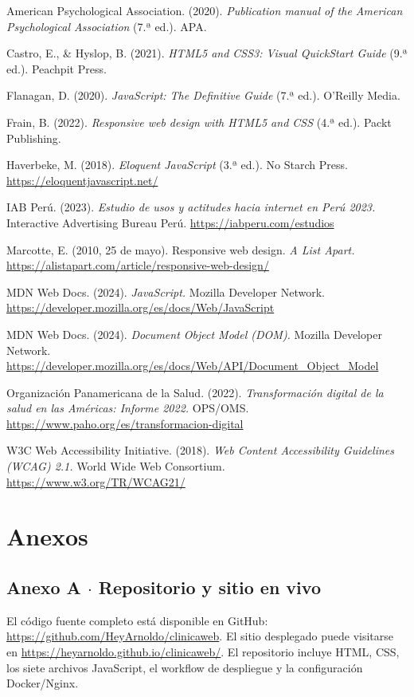 \documentclass[11pt,a4paper]{article}
\begin{document}
\begin{list}{}{\setlength{\leftmargin}{1.5em}\setlength{\itemindent}{-1.5em}\setlength{\itemsep}{6pt}}
\item American Psychological Association. (2020). \textit{Publication manual of the American Psychological Association} (7.ª ed.). APA.
\item Castro, E., \& Hyslop, B. (2021). \textit{HTML5 and CSS3: Visual QuickStart Guide} (9.ª ed.). Peachpit Press.
\item Flanagan, D. (2020). \textit{JavaScript: The Definitive Guide} (7.ª ed.). O'Reilly Media.
\item Frain, B. (2022). \textit{Responsive web design with HTML5 and CSS} (4.ª ed.). Packt Publishing.
\item Haverbeke, M. (2018). \textit{Eloquent JavaScript} (3.ª ed.). No Starch Press. \url{https://eloquentjavascript.net/}
\item IAB Perú. (2023). \textit{Estudio de usos y actitudes hacia internet en Perú 2023.} Interactive Advertising Bureau Perú. \url{https://iabperu.com/estudios}
\item Marcotte, E. (2010, 25 de mayo). Responsive web design. \textit{A List Apart.} \url{https://alistapart.com/article/responsive-web-design/}
\item MDN Web Docs. (2024). \textit{JavaScript.} Mozilla Developer Network. \url{https://developer.mozilla.org/es/docs/Web/JavaScript}
\item MDN Web Docs. (2024). \textit{Document Object Model (DOM).} Mozilla Developer Network. \url{https://developer.mozilla.org/es/docs/Web/API/Document_Object_Model}
\item Organización Panamericana de la Salud. (2022). \textit{Transformación digital de la salud en las Américas: Informe 2022.} OPS/OMS. \url{https://www.paho.org/es/transformacion-digital}
\item W3C Web Accessibility Initiative. (2018). \textit{Web Content Accessibility Guidelines (WCAG) 2.1.} World Wide Web Consortium. \url{https://www.w3.org/TR/WCAG21/}
\end{list}

\section{Anexos}

\subsection*{Anexo A $\cdot$ Repositorio y sitio en vivo}
El código fuente completo está disponible en GitHub: \url{https://github.com/HeyArnoldo/clinicaweb}. El sitio desplegado puede visitarse en \url{https://heyarnoldo.github.io/clinicaweb/}. El repositorio incluye HTML, CSS, los siete archivos JavaScript, el workflow de despliegue y la configuración Docker/Nginx.
\end{document}
